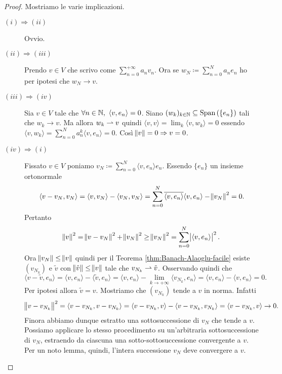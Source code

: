 \begin{proof}
    Mostriamo le varie implicazioni.
    \begin{description}
        \item[$ (i) \Rightarrow (ii) $] Ovvio.
        \item[$ (ii) \Rightarrow (iii) $] Prendo $ v \in V $ che scrivo come $ \sum_{n = 0}^{+\infty} a_n v_n $. Ora se $ w_{N} \coloneqq \sum_{n = 0}^{N} a_ne_n $ ho per ipotesi che $ w_N \to v $. 
        \item[$ (iii) \Rightarrow (iv) $] Sia $ v \in V $ tale che $ \forall n \in \mathbb{N}, \ {\langle v, e_n \rangle} = 0 $. Siano $ (w_k)_{k \in \mathbb{N}} \subseteq \operatorname{Span}{(\{e_n\})} $ tali che $ w_k \to v $. Ma allora $ w_k \rightharpoonup v $ quindi $ {\langle v, v \rangle} = \lim_{k} {\langle v, w_k \rangle} = 0 $ essendo $ {\langle v, w_k \rangle} = \sum_{n = 0}^{N} a_n^k {\langle v, e_n \rangle} = 0 $. Così $ \norm{v} = 0 \Rightarrow v = 0 $.
        \item[$ (iv) \Rightarrow (i) $] Fissato $ v \in V $ poniamo $ v_N \coloneqq \sum_{n = 0}^{N} {\langle v, e_n \rangle} e_n $. Essendo $ \{e_n\} $ un insieme ortonormale
        \[
        {\langle v - v_N, v_N \rangle} = {\langle v, v_N \rangle} - {\langle v_N, v_N \rangle} = \sum_{n = 0}^{N} \overline{{\langle v, e_n \rangle}}{\langle v, e_n \rangle} - \norm{v_N}^2 = 0.
        \]
        Pertanto
        \[
        \norm{v}^2 = \norm{v - v_N}^2 + \norm{v_N}^2 \geq \norm{v_N}^2 = \sum_{n = 0}^{N} \abs{{\langle v, e_n \rangle}}^2.
        \]
        Ora $ \norm{v_N} \leq \norm{v} $ quindi per il Teorema \ref{thm:Banach-Alaoglu-facile} esiste $ (v_{N_k}) $ e $ \tilde{v} $ con $ \norm{\tilde{v}} \leq \norm{v} $ tale che $ v_{N_k} \rightharpoonup \tilde{v} $. Osservando quindi che
        \[
        {\langle v - \tilde{v}, e_n \rangle} = {\langle v, e_n \rangle} - {\langle \tilde{v}, e_n \rangle} = {\langle v, e_n \rangle} - \lim_{k \to + \infty} {\langle v_{N_k}, e_n \rangle} = {\langle v, e_n \rangle} - {\langle v, e_n \rangle} = 0.
        \]
        Per ipotesi allora $ \tilde{v} = v $. Mostriamo che $ (v_{N_k}) $ tende a $ v $ in norma. Infatti
        \[
        \norm{v - v_{N_k}}^2 = {\langle v - v_{N_k}, v - v_{N_k}\rangle} = {\langle v - v_{N_k}, v \rangle} - {\langle v - v_{N_k}, v_{N_k} \rangle} = {\langle v - v_{N_k}, v \rangle} \to 0.
        \]
        Finora abbiamo dunque estratto una sottosuccessione di $ v_N $ che tende a $ v $. Possiamo applicare lo stesso procedimento su un'arbitraria sottosuccessione di $ v_N $, estraendo da ciascuna una sotto-sottosuccessione convergente a $ v $. Per un noto lemma, quindi, l'intera successione $ v_N $ deve convergere a $ v $. \qedhere
    \end{description}
\end{proof}

